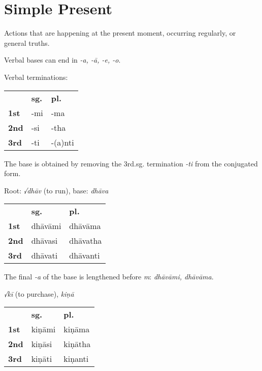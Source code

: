 \documentclass[11pt,oneside]{memoir}
\begin{document}
\section{Simple Present}
\label{sec:org0cbc828}

Actions that are happening at the present moment, occurring regularly, or general truths.

Verbal bases can end in \emph{-a, -ā, -e, -o}.

{\centering\par
\begin{multicols}{2}

Verbal terminations:

\begin{center}
\begin{tabular}{lll}
 & \textbf{sg.} & \textbf{pl.}\\[0pt]
\textbf{1st} & -mi & -ma\\[0pt]
\textbf{2nd} & -si & -tha\\[0pt]
\textbf{3rd} & -ti & -(a)nti\\[0pt]
\end{tabular}
\end{center}

The base is obtained by removing the 3rd.sg. termination \emph{-ti} from the conjugated form.

\columnbreak

Root: \emph{√dhāv} (to run), base: \emph{dhāva}

\begin{center}
\begin{tabular}{lll}
 & \textbf{sg.} & \textbf{pl.}\\[0pt]
\textbf{1st} & dhāvāmi & dhāvāma\\[0pt]
\textbf{2nd} & dhāvasi & dhāvatha\\[0pt]
\textbf{3rd} & dhāvati & dhāvanti\\[0pt]
\end{tabular}
\end{center}

The final \emph{-a} of the base is lengthened before \emph{m}: \emph{dhāvāmi, dhāvāma}.

\end{multicols}

\begin{multicols}{3}

\emph{√kī} (to purchase), \emph{kiṇā}

\begin{center}
\begin{tabular}{lll}
 & \textbf{sg.} & \textbf{pl.}\\[0pt]
\textbf{1st} & kiṇāmi & kiṇāma\\[0pt]
\textbf{2nd} & kiṇāsi & kiṇātha\\[0pt]
\textbf{3rd} & kiṇāti & kiṇanti\\[0pt]
\end{tabular}
\end{center}


\end{multicols}}
\end{document}
